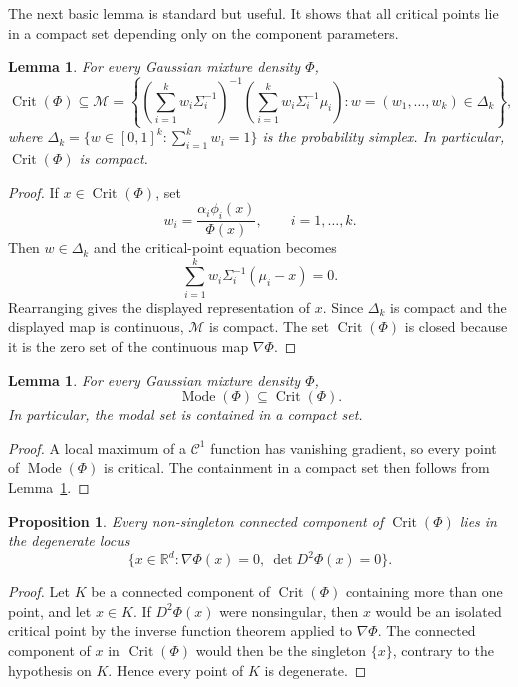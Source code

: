 \documentclass[11pt]{article}
\theoremstyle{plain}
\newtheorem{proposition}[theorem]{Proposition}
\newtheorem{lemma}[theorem]{Lemma}
\theoremstyle{definition}
\theoremstyle{remark}
\numberwithin{equation}{section}
\DeclareMathOperator{\Crit}{Crit}
\DeclareMathOperator{\Mode}{Mode}
\newcommand{\R}{\mathbb{R}}
\begin{document}
The next basic lemma is standard but useful. It shows that all critical points lie in a compact set depending only on the component parameters.

\begin{lemma}\label{lem:compact-critical}
For every Gaussian mixture density $\Phi$,
\[
\Crit(\Phi)\subseteq \mathcal M=\left\{\left(\sum_{i=1}^k w_i\Sigma_i^{-1}\right)^{-1}
\left(\sum_{i=1}^k w_i\Sigma_i^{-1}\mu_i\right): w=(w_1,\dots,w_k)\in \Delta_k\right\},
\]
where $\Delta_k=\{w\in[0,1]^k:\sum_{i=1}^k w_i=1\}$ is the probability simplex. In particular, $\Crit(\Phi)$ is compact.
\end{lemma}

\begin{proof}
If $x\in\Crit(\Phi)$, set
\[
w_i=\frac{\alpha_i\phi_i(x)}{\Phi(x)},\qquad i=1,\dots,k.
\]
Then $w\in\Delta_k$ and the critical-point equation becomes
\[
\sum_{i=1}^k w_i\Sigma_i^{-1}(\mu_i-x)=0.
\]
Rearranging gives the displayed representation of $x$. Since $\Delta_k$ is compact and the displayed map is continuous, $\mathcal M$ is compact. The set $\Crit(\Phi)$ is closed because it is the zero set of the continuous map $\nabla\Phi$.
\end{proof}

\begin{lemma}\label{lem:modal-critical}
For every Gaussian mixture density $\Phi$,
\[
\Mode(\Phi)\subseteq \Crit(\Phi).
\]
In particular, the modal set is contained in a compact set.
\end{lemma}

\begin{proof}
A local maximum of a $\mathcal{C}^1$ function has vanishing gradient, so every point of $\Mode(\Phi)$ is critical. The containment in a compact set then follows from Lemma~\ref{lem:compact-critical}.
\end{proof}

\begin{proposition}\label{prop:nonsingleton-critical-components}
Every non-singleton connected component of $\Crit(\Phi)$ lies in the degenerate locus
\[
\{x\in\R^d:\nabla\Phi(x)=0,\ \det D^2\Phi(x)=0\}.
\]
\end{proposition}

\begin{proof}
Let $K$ be a connected component of $\Crit(\Phi)$ containing more than one point, and let $x\in K$. If $D^2\Phi(x)$ were nonsingular, then $x$ would be an isolated critical point by the inverse function theorem applied to $\nabla\Phi$. The connected component of $x$ in $\Crit(\Phi)$ would then be the singleton $\{x\}$, contrary to the hypothesis on $K$. Hence every point of $K$ is degenerate.
\end{proof}
\end{document}
